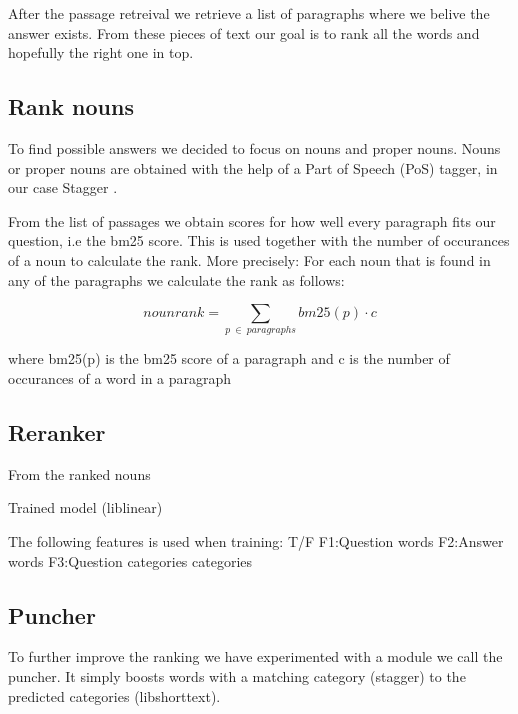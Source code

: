 After the passage retreival we retrieve a list of paragraphs where we belive the answer exists. 
From these pieces of text our goal is to rank all the words and hopefully the right one in top.

\subsection{Rank nouns}

To find possible answers we decided to focus on nouns and proper nouns. 
Nouns or proper nouns are obtained with the help of a Part of Speech (PoS) tagger, in our case Stagger \cite{stagger}.

From the list of passages we obtain scores for how well every paragraph fits our question, i.e the bm25 score. 
This is used together with the number of occurances of a noun to calculate the rank.
More precisely: For each noun that is found in any of the paragraphs we calculate the rank as follows:

\[ nounrank = \sum_{p\:\in\:paragraphs}bm25(p) \cdot c \]

where bm25(p) is the bm25 score of a paragraph and c is the number of occurances of a word in a paragraph

\subsection{Reranker}

From the ranked nouns 

Trained model (liblinear)

The following features is used when training:
T/F	F1:Question words	F2:Answer words	F3:Question categories
categories

\subsection{Puncher}

To further improve the ranking we have experimented with a module we call the puncher. It simply boosts 
words with a matching category (stagger) to the predicted categories (libshorttext). 